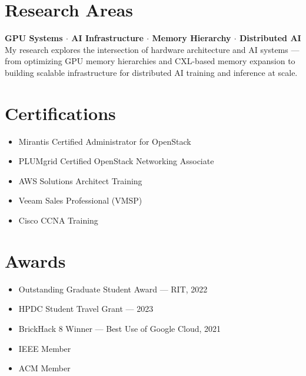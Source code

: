 \documentclass[letterpaper,11pt]{article}
\begin{document}
\section{Research Areas}
\begin{itemize}[leftmargin=0.15in, label={}]
    \small{\item{
    \textbf{GPU Systems $\cdot$ AI Infrastructure $\cdot$ Memory Hierarchy $\cdot$ Distributed AI} \\
    My research explores the intersection of hardware architecture and AI systems --- from optimizing GPU memory hierarchies and CXL-based memory expansion to building scalable infrastructure for distributed AI training and inference at scale.
    }}
\end{itemize}

\section{Certifications}
\begin{itemize}[leftmargin=0.15in]
    \item Mirantis Certified Administrator for OpenStack
    \item PLUMgrid Certified OpenStack Networking Associate
    \item AWS Solutions Architect Training
    \item Veeam Sales Professional (VMSP)
    \item Cisco CCNA Training
\end{itemize}

\section{Awards}
\begin{itemize}[leftmargin=0.15in]
    \item Outstanding Graduate Student Award --- RIT, 2022
    \item HPDC Student Travel Grant --- 2023
    \item BrickHack 8 Winner --- Best Use of Google Cloud, 2021
    \item IEEE Member
    \item ACM Member
\end{itemize}
\end{document}
